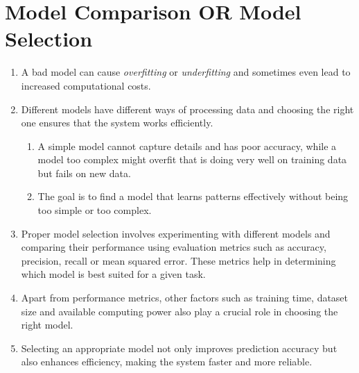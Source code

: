 \section{Model Comparison OR Model Selection}

\begin{enumerate}
    \item A bad model can cause \textit{overfitting} or \textit{underfitting} and sometimes even lead to increased computational costs.
    \hfill \cite{geeksforgeeks/machine-learning/model-selection-for-machine-learning}

    \item Different models have different ways of processing data and choosing the right one ensures that the system works efficiently.
    \hfill \cite{geeksforgeeks/machine-learning/model-selection-for-machine-learning}
    \begin{enumerate}
        \item A simple model cannot capture details and has poor accuracy, while a model too complex might overfit that is doing very well on training data but fails on new data.
        \hfill \cite{geeksforgeeks/machine-learning/model-selection-for-machine-learning}

        \item The goal is to find a model that learns patterns effectively without being too simple or too complex.
        \hfill \cite{geeksforgeeks/machine-learning/model-selection-for-machine-learning}
    \end{enumerate}

    \item Proper model selection involves experimenting with different models and comparing their performance using evaluation metrics such as accuracy, precision, recall or mean squared error.
    These metrics help in determining which model is best suited for a given task.
    \hfill \cite{geeksforgeeks/machine-learning/model-selection-for-machine-learning}

    \item Apart from performance metrics, other factors such as training time, dataset size and available computing power also play a crucial role in choosing the right model.
    \hfill \cite{geeksforgeeks/machine-learning/model-selection-for-machine-learning}

    \item Selecting an appropriate model not only improves prediction accuracy but also enhances efficiency, making the system faster and more reliable.
    \hfill \cite{geeksforgeeks/machine-learning/model-selection-for-machine-learning}
\end{enumerate}




